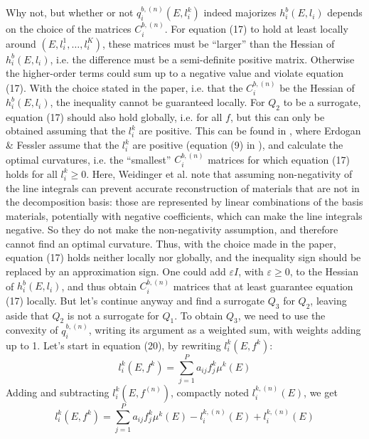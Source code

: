 \documentclass[a4paper, 10pt]{article}
\begin{document}
Why not, but whether or not $q_i^{b, (n)}(E, l_i^k)$ indeed majorizes $h_i^b(E, l_i)$ depends on the choice of the matrices $C_i^{b, (n)}$. For equation (17) to hold at least 
locally around $(E, l_i^1, \hdots, l_i^K)$, these matrices must be ``larger'' than the Hessian of $h_i^b(E, l_i)$, i.e. the difference must be a semi-definite positive matrix. Otherwise
the higher-order terms could sum up to a negative value and violate equation (17). With the choice stated in the paper, i.e. that the $C_i^{b, (n)}$ be the Hessian of $h_i^b(E, l_i)$, 
the inequality cannot be guaranteed locally. For $Q_2$ to be a surrogate, equation (17) should also hold globally, i.e. for all $f$, but this can only be obtained assuming that the 
$l_i^k$ are positive. This can be found in \cite{erdogan_monotonic_1999}, where Erdogan \& Fessler assume that the $l_i^k$ are positive (equation (9) in \cite{erdogan_monotonic_1999}), 
and calculate the optimal curvatures, i.e. the ``smallest'' $C_i^{b, (n)}$ matrices for which equation (17) holds for all $l_i^k \geq 0$.
Here, Weidinger et al. note that assuming non-negativity of the line integrals can prevent accurate reconstruction
of materials that are not in the decomposition basis: those are represented by linear combinations of the basis materials, potentially with negative coefficients, which can make the line integrals negative. 
So they do not make the non-negativity assumption, and therefore cannot find an optimal curvature. 
Thus, with the choice made in the paper, equation (17) holds neither locally nor globally, and the inequality sign should be replaced by an approximation sign. 
One could add $\varepsilon I$, with $\varepsilon \geq 0$, to the Hessian of $h_i^b(E, l_i)$, and thus obtain $C_i^{b, (n)}$ matrices that at least guarantee equation (17) locally. 
But let's continue anyway and find a surrogate $Q_3$ for $Q_2$, leaving aside that $Q_2$ is not a surrogate for $Q_1$.
To obtain $Q_3$, we need to use the convexity of $q_i^{b, (n)}$, writing its argument as a weighted sum, with weights adding up to 1. Let's start in equation (20), by rewriting $l_i^k\left( E, f^k\right)$:
\begin{equation*}
 l_i^k\left( E, f^k\right) = \sum_{j=1}^P a_{ij} f_j^k \mu^k(E)
\end{equation*}
Adding and subtracting $l_i^k\left( E, f^{(n)}\right)$, compactly noted $l_i^{k, (n)}(E)$, we get
\begin{equation*}
 l_i^k\left( E, f^k\right) = \sum_{j=1}^P a_{ij} f_j^k \mu^k(E) - l_i^{k, (n)}(E) + l_i^{k, (n)}(E)
\end{equation*}
\end{document}
